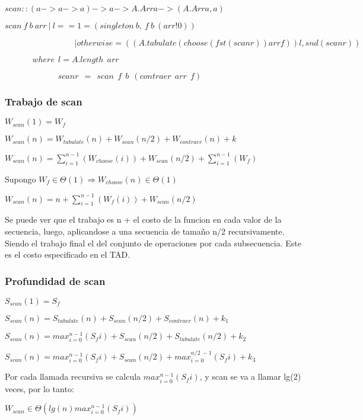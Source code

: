 \documentclass[a4paper,12pt]{article}
\begin{document}
$scan :: (a -> a -> a) -> a -> A.Arr a -> (A.Arr a, a)$

$scan \:f \:b \:arr \:|\: l == 1  = (singleton\: b,\: f\: b\: (arr!0))$

$\:\:\:\:\:\:\:\:\:\:\:\:\:\:\:\:\:\:\:\:\:\:\:\:\:\:\:\:\:\:\:\:\:\:\:\:\:\:| otherwise = ((A.tabulate (choose (fst (scanr)) arr f)) l, snd (scanr))$

$\:\:\:\:\:\:\:\:\:\:\:\:\:\:\:where\:\: l = A.length\:\: arr$

$\:\:\:\:\:\:\:\:\:\:\:\:\:\:\:\:\:\:\:\:\:\:\:\:\:\:\:\:\:scanr\:\: =\:\: scan\:\: f\:\: b\:\: (contraer \:\:arr\:\: f)   $

\subsubsection{Trabajo de scan}

$W_{scan}(1) = W_{f}$

$W_{scan}(n) = W_{tabulate}(n) + W_{scan}(n/2) + W_{contraer}(n) + k$

$W_{scan}(n) = \sum_{i=1}^{n-1}(W_{choose}(i)) + W_{scan}(n/2) + \sum_{i=1}^{n-1}(W_{f})$

Supongo $W_{f} \in \Theta(1) \Rightarrow W_{choose}(n) \in \Theta(1)$

$W_{scan}(n) = n + \sum_{i=1}^{n-1}(W_{f}(i)) + W_{scan}(n/2)$

Se puede ver que el trabajo es n + el costo de la funcion en cada valor de la secuencia, luego, aplicandose a una secuencia de tamaño n/2 recursivamente. Siendo el trabajo final el del conjunto de operaciones por cada subsecuencia. Este es el costo especificado en el TAD.

\subsubsection{Profundidad de scan}

$S_{scan}(1) = S_{f}$

$S_{scan}(n) = S_{tabulate}(n) + S_{scan}(n/2) + S_{contraer}(n) + k_1$

$S_{scan}(n) = max_{i=0}^{n-1} (S_{f} i) + S_{scan}(n/2) + S_{tabulate}(n/2) + k_2$

$S_{scan}(n) = max_{i=0}^{n-1} (S_{f} i) + S_{scan}(n/2) + max_{i=0}^{n/2\:-1} (S_{f} i) + k_3$

Por cada llamada recursiva se calcula $max_{i=0}^{n-1} (S_{f} i)$, y scan se va a llamar lg(2) veces, por lo tanto:

$W_{scan} \in  \Theta(lg(n) max_{i=0}^{n-1} (S_{f} i))$
\end{document}
